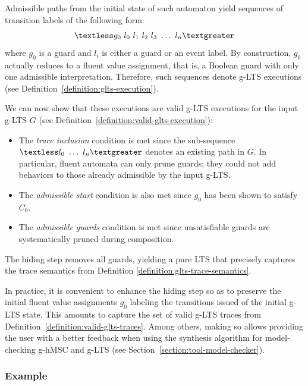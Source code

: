 Admissible paths from the initial state of such automaton yield sequences of transition labels of the following form:
\begin{align*}\textless g_0~l_0~l_1~l_2~l_3~\ldots~l_n \textgreater \end{align*}
where $g_0$ is a guard and $l_i$ is either a guard or an event label. By construction, $g_0$ actually reduces to a fluent value assignment, that is, a Boolean guard with only one admissible interpretation. Therefore, such sequences denote g-LTS executions (see Definition~\ref{definition:glts-execution}).

We can now show that these executions are valid g-LTS executions for the input g-LTS $G$ (see Definition~\ref{definition:valid-glts-execution}):
\begin{itemize}
\item The \emph{trace inclusion} condition is met since the sub-sequence $\textless l_0~\ldots~l_n \textgreater$ denotes an existing path in $G$. In particular, fluent automata can only prune guards; they could not add behaviors to those already admissible by the input g-LTS.
\item The \emph{admissible start} condition is also met since $g_0$ has been shown to satisfy $C_0$.
\item The \emph{admissible guards} condition is met since unsatisfiable guards are systematically pruned during composition.
\end{itemize}

The hiding step removes all guards, yielding a pure LTS that precisely captures the trace semantics from Definition \ref{definition:glts-trace-semantics}. 

In practice, it is convenient to enhance the hiding step so as to preserve the initial fluent value assignments $g_0$ labeling the transitions issued of the initial g-LTS state. This amounts to capture the set of valid g-LTS traces from Definition~\ref{definition:valid-glts-traces}. Among others, making so allows providing the user with a better feedback when using the synthesis algorithm for model-checking g-hMSC and g-LTS (see Section~\ref{section:tool-model-checker}).

\subsubsection*{Example}

